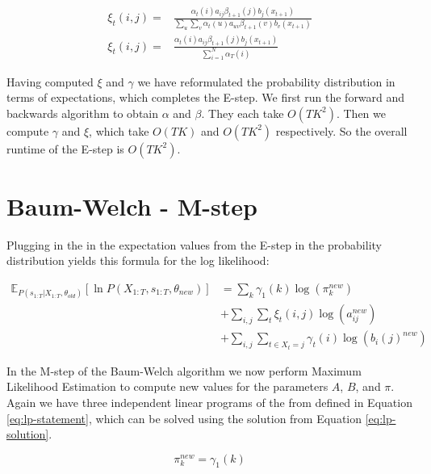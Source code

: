 \begin{equation}
\begin{aligned}
\xi_{t}(i, j)=&\frac{\alpha_{t}(i) a_{i j} \beta_{t+1}(j) b_{j}(x_{t+1})}{\sum_{u} \sum_{v} \alpha_{t}(u) a_{u v} \beta_{t+1}(v) b_{v}( x_{t+1})} \\
\xi_{t}(i, j)=&\frac{\alpha_{t}(i) a_{i j} \beta_{t+1}(j) b_{j} (x_{t+1})}{\sum_{i=1}^{N} \alpha_{T}(i)}
\label{eq:xi-def}
\end{aligned}
\end{equation}

Having computed $\xi$ and $\gamma$ we have reformulated the probability distribution in terms of expectations, which completes the E-step. We first run the forward and backwards algorithm to obtain $\alpha$ and $\beta$. They each take $O(TK^2)$. Then we compute $\gamma$ and $\xi$, which take $O(TK)$ and $O(TK^2)$ respectively. So the overall runtime of the E-step is $O(TK^2)$.

\section{Baum-Welch - M-step}

Plugging in the in the expectation values from the E-step in the probability distribution yields this formula for the log likelihood:

\begin{equation}
\begin{aligned}
\mathbb{E}_{P\left(s_{1: T} | X_{1: T}, \theta_{o l d}\right)}\left[\ln P\left(X_{1: T}, s_{1: T}, \theta_{n e w}\right)\right] &=\sum_{k} \gamma_{1}(k) \log \left(\pi_{k}^{n e w}\right) \\
&+\sum_{i, j} \sum_{t} \xi_{t}(i, j) \log \left(a_{i j}^{n e w}\right) \\
&+\sum_{i, j} \sum_{t \in X_t = j} \gamma_{t}(i)   \log \left(b_{i}(j)^{n e w}\right)
\end{aligned}
\end{equation}

In the M-step of the Baum-Welch algorithm we now perform Maximum Likelihood Estimation to compute new values for the parameters $A$, $B$, and $\pi$. Again we have three independent linear programs of the from defined in Equation \eqref{eq:lp-statement}, which can be solved using the solution from Equation \eqref{eq:lp-solution}. 

\begin{equation}
  \pi_{k}^{n e w}=\gamma_{1}(k) 
\end{equation}

